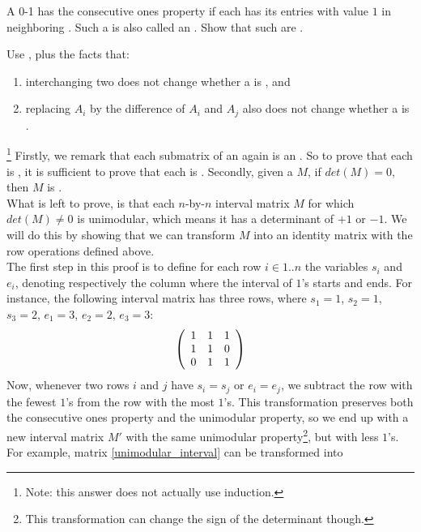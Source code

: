 \begin{exercise}
A 0-1  has the consecutive ones property if each  has its entries with value $1$ in neighboring . Such a  is also called an . Show that such  are .
\begin{hint}
Use , plus the facts that:
\begin{enumerate}
 \item interchanging two  does not change whether a  is , and
 \item replacing  $A_i$ by the difference of  $A_i$ and $A_j$ also does not change whether a  is .
\end{enumerate}
\end{hint}
\begin{answer}
\footnote{Note: this answer does not actually use induction.}
Firstly, we remark that each  submatrix of an  again is an . So to prove that each  is , it is sufficient to prove that each   is . Secondly, given a   $M$, if $det(M)=0$, then $M$ is .\\
What is left to prove, is that each $n$-by-$n$ interval matrix $M$ for which $det(M)\neq 0$ is unimodular, which means it has a determinant of $+1$ or $-1$. We will do this by showing that we can transform $M$ into an identity matrix with the row operations defined above.\\
The first step in this proof is to define for each row $i \in 1..n$ the variables $s_i$ and $e_i$, denoting respectively the column where the interval of $1$'s starts and ends. For instance, the following interval matrix has three rows, where $s_1=1$, $s_2=1$, $s_3=2$, $e_1=3$, $e_2=2$, $e_3=3$:
\begin{equation}
\label{unimodular_interval}
\left( \begin{array}{ccc}
1&1&1\\
1&1&0\\
0&1&1
\end{array} \right)
\end{equation}
Now, whenever two rows $i$ and $j$ have $s_i=s_j$ or $e_i=e_j$, we subtract the row with the fewest $1$'s from the row with the most $1$'s. This transformation preserves both the consecutive ones property and the unimodular property, so we end up with a new interval matrix $M'$ with the same unimodular property\footnote{This transformation can change the sign of the determinant though.}, but with less $1$'s. For example, matrix \ref{unimodular_interval} can be transformed into

\end{answer}
\end{exercise}
